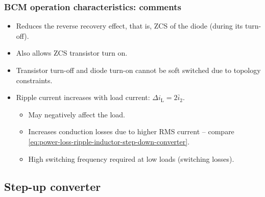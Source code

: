 \begin{frame}
	\frametitle{BCM operation characteristics: comments}
	\begin{itemize}
		\item<1-> Reduces the reverse recovery effect, that is, ZCS of the diode (during its turn-off).
		\item<2-> Also allows ZCS transistor turn on.
	\end{itemize}
	\vspace{1em}
	\begin{itemize}
		\item<3-> Transistor turn-off and diode turn-on cannot be soft switched due to topology constraints.
		\item<4-> Ripple current increases with load current: $ \Delta i_\mathrm{L} = 2\overline{i}_2$.
		      \begin{itemize}
			      \item May negatively affect the load.
			      \item Increases conduction losses due to higher RMS current -- compare \eqref{eq:power-loss-ripple-inductor-step-down-converter}.
			      \item High switching frequency required at low loads (switching losses).
		      \end{itemize}
	\end{itemize}
\end{frame}

\subsection{Step-up converter}


